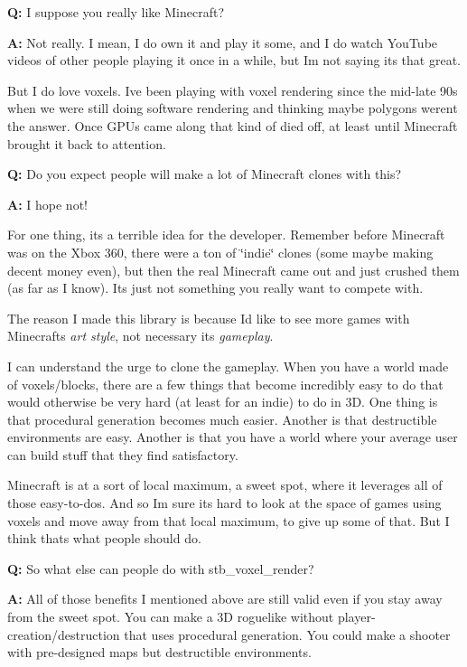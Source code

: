 {\bfseries{Q\+:}} I suppose you really like Minecraft?

{\bfseries{A\+:}} Not really. I mean, I do own it and play it some, and I do watch You\+Tube videos of other people playing it once in a while, but I\textquotesingle{}m not saying it\textquotesingle{}s that great.

But I do love voxels. I\textquotesingle{}ve been playing with voxel rendering since the mid-\/late 90\textquotesingle{}s when we were still doing software rendering and thinking maybe polygons weren\textquotesingle{}t the answer. Once G\+P\+Us came along that kind of died off, at least until Minecraft brought it back to attention.

{\bfseries{Q\+:}} Do you expect people will make a lot of Minecraft clones with this?

{\bfseries{A\+:}} I hope not!

For one thing, it\textquotesingle{}s a terrible idea for the developer. Remember before Minecraft was on the Xbox 360, there were a ton of \char`\"{}indie\char`\"{} clones (some maybe making decent money even), but then the real Minecraft came out and just crushed them (as far as I know). It\textquotesingle{}s just not something you really want to compete with.

The reason I made this library is because I\textquotesingle{}d like to see more games with Minecraft\textquotesingle{}s {\itshape art style}, not necessary its {\itshape gameplay}.

I can understand the urge to clone the gameplay. When you have a world made of voxels/blocks, there are a few things that become incredibly easy to do that would otherwise be very hard (at least for an indie) to do in 3D. One thing is that procedural generation becomes much easier. Another is that destructible environments are easy. Another is that you have a world where your average user can build stuff that they find satisfactory.

Minecraft is at a sort of local maximum, a sweet spot, where it leverages all of those easy-\/to-\/dos. And so I\textquotesingle{}m sure it\textquotesingle{}s hard to look at the space of \textquotesingle{}games using voxels\textquotesingle{} and move away from that local maximum, to give up some of that. But I think that\textquotesingle{}s what people should do.

{\bfseries{Q\+:}} So what else can people do with stb\+\_\+voxel\+\_\+render?

{\bfseries{A\+:}} All of those benefits I mentioned above are still valid even if you stay away from the sweet spot. You can make a 3D roguelike without player-\/creation/destruction that uses procedural generation. You could make a shooter with pre-\/designed maps but destructible environments.

